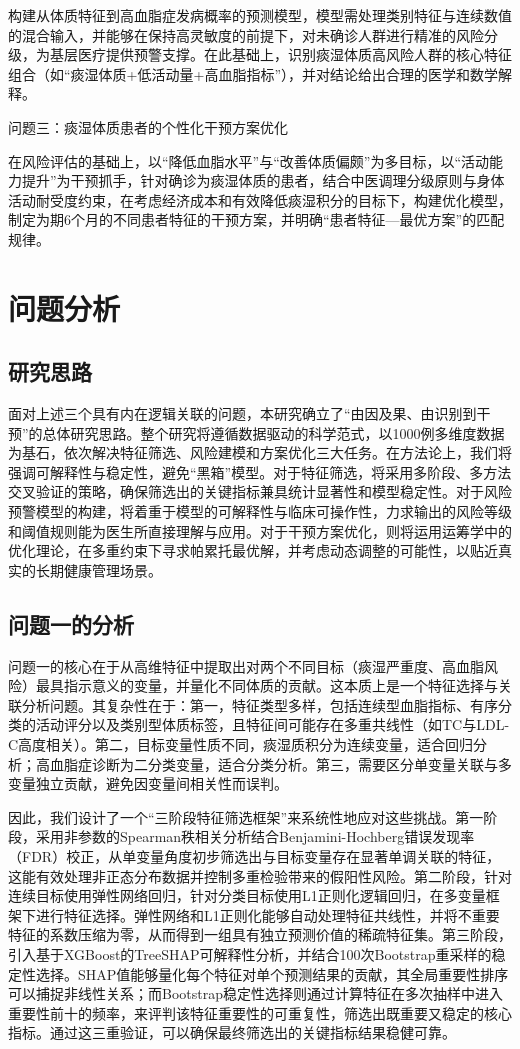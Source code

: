 \documentclass[12pt,a4paper]{ctexart}
\begin{document}
构建从体质特征到高血脂症发病概率的预测模型，模型需处理类别特征与连续数值的混合输入，并能够在保持高灵敏度的前提下，对未确诊人群进行精准的风险分级，为基层医疗提供预警支撑。在此基础上，识别痰湿体质高风险人群的核心特征组合（如“痰湿体质+低活动量+高血脂指标”），并对结论给出合理的医学和数学解释。

问题三：痰湿体质患者的个性化干预方案优化

在风险评估的基础上，以“降低血脂水平”与“改善体质偏颇”为多目标，以“活动能力提升”为干预抓手，针对确诊为痰湿体质的患者，结合中医调理分级原则与身体活动耐受度约束，在考虑经济成本和有效降低痰湿积分的目标下，构建优化模型，制定为期6个月的不同患者特征的干预方案，并明确“患者特征—最优方案”的匹配规律。
\section{问题分析}
\subsection{研究思路}
面对上述三个具有内在逻辑关联的问题，本研究确立了“由因及果、由识别到干预”的总体研究思路。整个研究将遵循数据驱动的科学范式，以1000例多维度数据为基石，依次解决特征筛选、风险建模和方案优化三大任务。在方法论上，我们将强调可解释性与稳定性，避免“黑箱”模型。对于特征筛选，将采用多阶段、多方法交叉验证的策略，确保筛选出的关键指标兼具统计显著性和模型稳定性。对于风险预警模型的构建，将着重于模型的可解释性与临床可操作性，力求输出的风险等级和阈值规则能为医生所直接理解与应用。对于干预方案优化，则将运用运筹学中的优化理论，在多重约束下寻求帕累托最优解，并考虑动态调整的可能性，以贴近真实的长期健康管理场景。
\subsection{问题一的分析}
问题一的核心在于从高维特征中提取出对两个不同目标（痰湿严重度、高血脂风险）最具指示意义的变量，并量化不同体质的贡献。这本质上是一个特征选择与关联分析问题。其复杂性在于：第一，特征类型多样，包括连续型血脂指标、有序分类的活动评分以及类别型体质标签，且特征间可能存在多重共线性（如TC与LDL-C高度相关）。第二，目标变量性质不同，痰湿质积分为连续变量，适合回归分析；高血脂症诊断为二分类变量，适合分类分析。第三，需要区分单变量关联与多变量独立贡献，避免因变量间相关性而误判。

因此，我们设计了一个“三阶段特征筛选框架”来系统性地应对这些挑战。第一阶段，采用非参数的Spearman秩相关分析结合Benjamini-Hochberg错误发现率（FDR）校正，从单变量角度初步筛选出与目标变量存在显著单调关联的特征，这能有效处理非正态分布数据并控制多重检验带来的假阳性风险。第二阶段，针对连续目标使用弹性网络回归，针对分类目标使用L1正则化逻辑回归，在多变量框架下进行特征选择。弹性网络和L1正则化能够自动处理特征共线性，并将不重要特征的系数压缩为零，从而得到一组具有独立预测价值的稀疏特征集。第三阶段，引入基于XGBoost的TreeSHAP可解释性分析，并结合100次Bootstrap重采样的稳定性选择。SHAP值能够量化每个特征对单个预测结果的贡献，其全局重要性排序可以捕捉非线性关系；而Bootstrap稳定性选择则通过计算特征在多次抽样中进入重要性前十的频率，来评判该特征重要性的可重复性，筛选出既重要又稳定的核心指标。通过这三重验证，可以确保最终筛选出的关键指标结果稳健可靠。
\end{document}
